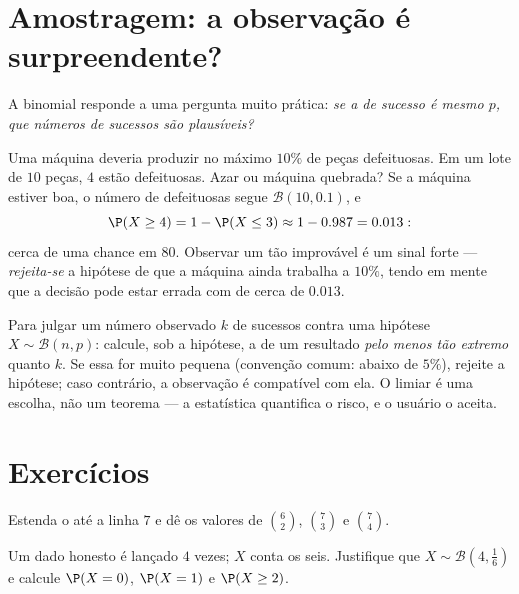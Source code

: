 \section{Amostragem: a observação é surpreendente?}

A  binomial responde a uma pergunta muito prática:
\emph{se a  de sucesso é mesmo $p$, que números de sucessos
são plausíveis?}

\begin{example}\label{ex:g11:binom:decision}
Uma máquina deveria produzir no máximo $10\%$ de peças defeituosas. Em um
lote de $10$ peças, $4$ estão defeituosas. Azar ou máquina quebrada? Se a
máquina estiver boa, o número de defeituosas segue
$\mathcal B(10, 0.1)$, e
\[
\P(X \geq 4) = 1 - \P(X \leq 3) \approx 1 - 0.987 = 0.013 :
\]
cerca de uma chance em $80$. Observar um  tão improvável é um sinal
forte --- \emph{rejeita-se} a hipótese de que a máquina ainda trabalha a
$10\%$, tendo em mente que a decisão pode estar errada com 
de cerca de $0.013$.
\end{example}

\begin{method}\label{met:g11:binom:decision}
Para julgar um número observado $k$ de sucessos contra uma hipótese
$X \sim \mathcal B(n, p)$: calcule, sob a hipótese, a  de um
resultado \emph{pelo menos tão extremo} quanto $k$. Se essa 
for muito pequena (convenção comum: abaixo de $5\%$), rejeite a hipótese;
caso contrário, a observação é compatível com ela. O limiar é uma
escolha, não um teorema --- a estatística quantifica o risco, e o usuário
o aceita.
\end{method}

\section{Exercícios}

\begin{exercise}[$\star$]\label{exo:g11:binom:1}
Estenda o  até a linha $7$ e dê os valores de
$\binom62$, $\binom{7}{3}$ e $\binom74$.
\end{exercise}

\begin{exercise}[$\star$]\label{exo:g11:binom:2}
Um dado honesto é lançado $4$ vezes; $X$ conta os seis. Justifique que
$X \sim \mathcal B\left(4, \frac16\right)$ e calcule $\P(X = 0)$,
$\P(X = 1)$ e $\P(X \geq 2)$.
\end{exercise}

